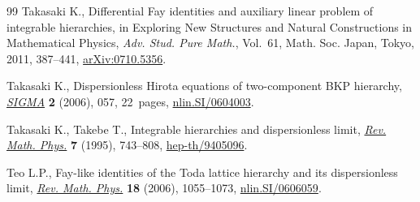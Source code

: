 \documentclass[pdftex]{sigma}
\begin{document}
\begin{thebibliography}{99}
Takasaki K., Dif\/ferential {F}ay identities and auxiliary linear problem of
  integrable hierarchies, in Exploring New Structures and Natural Constructions
  in Mathematical Physics, \textit{Adv. Stud. Pure Math.}, Vol.~61, Math. Soc.
  Japan, Tokyo, 2011, 387--441, \href{http://arxiv.org/abs/0710.5356}{arXiv:0710.5356}.

Takasaki K., Dispersionless {H}irota equations of two-component {BKP}
  hierarchy, \href{http://dx.doi.org/10.3842/SIGMA.2006.057}{\textit{SIGMA}} \textbf{2} (2006), 057, 22~pages,
  \href{http://arxiv.org/abs/nlin.SI/0604003}{nlin.SI/0604003}.


Takasaki K., Takebe T., Integrable hierarchies and dispersionless limit,
  \href{http://dx.doi.org/10.1142/S0129055X9500030X}{\textit{Rev. Math. Phys.}} \textbf{7} (1995), 743--808,
  \href{http://arxiv.org/abs/hep-th/9405096}{hep-th/9405096}.

Teo L.P., Fay-like identities of the {T}oda lattice hierarchy and its
  dispersionless limit, \href{http://dx.doi.org/10.1142/S0129055X06002838}{\textit{Rev. Math. Phys.}} \textbf{18} (2006),
  1055--1073, \href{http://arxiv.org/abs/nlin.SI/0606059}{nlin.SI/0606059}.

\end{thebibliography}\LastPageEnding
\end{document}
